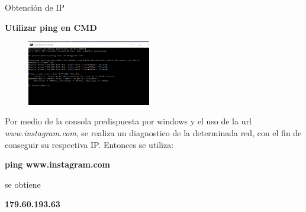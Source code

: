 
\begin{frame}[t,plain]
\titlepage
\end{frame}




\begin{frame}[t]{Obtención de IP}

\textbf{Utilizar ping en CMD}

\begin{figure} 
\vspace{2pt}
  \begin{center}
    \includegraphics[width=0.48\textwidth]{pinginstagram.png}
    \label{fig:databaseUserTable}
  \end{center}
  \vspace{2pt}
\end{figure} 

\bigskip

Por medio de la consola predispuesta por windows y el uso de la url \emph{www.instagram.com}, se realiza un diagnostico de la determinada red, con el fin de conseguir su respectiva IP. 
Entonces se utiliza:

\begin{center}
   \textbf{ping www.instagram.com}
\end{center}

se obtiene

\begin{center}
   \textbf{179.60.193.63}
\end{center}





\end{frame}



